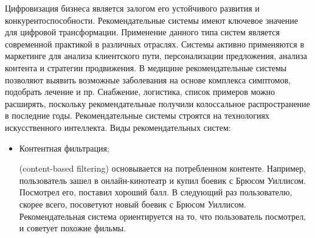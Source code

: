 Цифровизация бизнеса является залогом его устойчивого развития и
конкурентоспособности.
Рекомендательные системы имеют ключевое
значение для цифровой трансформации.
Применение данного типа систем
является современной практикой в различных отраслях.
Системы активно применяются в маркетинге для анализа клиентского пути, персонализации
предложения, анализа контента и стратегии продвижения.
В медицине рекомендательные системы позволяют выявить возможные заболевания на
основе комплекса симптомов, подобрать лечение и пр.
Снабжение, логистика, список примеров можно расширять, поскольку рекомендательные
получили колоссальное распространение в последние годы.
Рекомендательные системы строятся на технологиях искусственного интеллекта.
Виды рекомендательных систем:
\begin{itemize}
    \item Контентная фильтрация; \par
    (content-based filtering) основывается на потребленном контенте.
    Например, пользователь зашел в онлайн-кинотеатр и купил боевик с Брюсом Уиллисом.
    Посмотрел его, поставил хороший балл.
    В следующий раз пользователю, скорее всего, посоветуют новый боевик с Брюсом Уиллисом.
    Рекомендательная система ориентируется на то, что пользователь посмотрел, и советует похожие фильмы.


\end{itemize}
